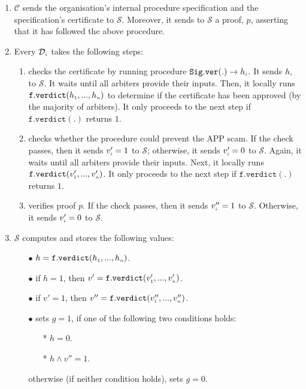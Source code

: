  \begin{enumerate}[label=(\Alph*)]
\item\label{C-side} $\mathcal{C}$ sends the organisation's internal procedure specification and the specification's certificate  to  $\mathcal{S}$. Moreover,   it sends to $\mathcal{S}$  a proof, $p$, asserting that it has followed the above procedure. 

\item\label{D-side} Every  $\mathcal{D}_{\scriptscriptstyle i}$ takes the following steps:
 
 \begin{enumerate}
 \item checks the certificate by running procedure $\mathtt{Sig.ver}(.)\rightarrow h_{\scriptscriptstyle i}$. It sends $h_{\scriptscriptstyle i}$ to $\mathcal{S}$. It waits until all arbiters provide their inputs. Then, it locally runs $\mathtt{f.verdict}(h_{\scriptscriptstyle 1},...,h_{\scriptscriptstyle n})$ to determine if the certificate has been approved (by the majority of arbiters). It only proceeds to the next step if $\mathtt{f.verdict}(.)$ returns $1$.  
%
 \item\label{subprotocol::evaluate-procedure}  checks whether the  procedure could prevent the APP scam. If the check passes, then it sends $v'_{\scriptscriptstyle i}=1$  to $\mathcal{S}$; otherwise, it sends $v'_{\scriptscriptstyle i}=0$  to $\mathcal{S}$. Again, it waits until all arbiters provide their inputs. Next, it locally runs $\mathtt{f.verdict}(v'_{\scriptscriptstyle 1},...,v'_{\scriptscriptstyle n})$. It only proceeds to the next step if $\mathtt{f.verdict}(.)$ returns $1$.
 \item verifies  proof $p$. If the check passes, then it sends $v''_{\scriptscriptstyle i}=1$  to $\mathcal{S}$. Otherwise, it sends $v'_{\scriptscriptstyle i}=0$  to $\mathcal{S}$.
 
 \end{enumerate} 
 
\item\label{S-side} $\mathcal{S}$ computes and stores the following values:
  \begin{itemize}
  \item [$\bullet$] $h=\mathtt{f.verdict}(h_{\scriptscriptstyle 1},...,h_{\scriptscriptstyle n})$.
  \item [$\bullet$] if $h=1$, then $v'=\mathtt{f.verdict}(v'_{\scriptscriptstyle 1},...,v'_{\scriptscriptstyle n})$.
  \item [$\bullet$] if $v'=1$, then $v''=\mathtt{f.verdict}(v''_{\scriptscriptstyle 1},...,v''_{\scriptscriptstyle n})$.
   \item [$\bullet$] sets $g=1$, if one of the  following two conditions holds:  
   
   \begin{itemize}
   \item[*]  $h=0$.
   \item[*]   $h\wedge v'' =1$.
  \end{itemize}
 otherwise (if neither condition holds), sets $g=0$. 
   \end{itemize} 
 \end{enumerate} 
 

